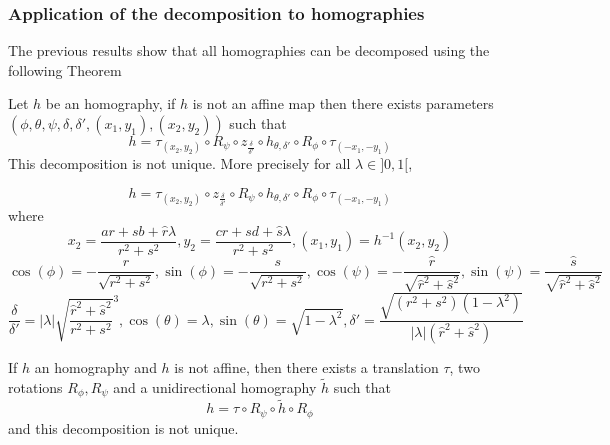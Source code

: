 \subsubsection{Application of the decomposition to homographies}
The previous results show that all homographies can be decomposed using the following Theorem

\begin{thm}
Let $h$ be an homography, if $h$ is not an affine map then there exists parameters $(\phi,\theta,\psi,\delta,\delta',(x_1,y_1),(x_2,y_2))$ such that
\begin{equation*}
h = \tau_{(x_2,y_2)} \circ R_{\psi} \circ z_{\frac{\delta}{\delta'}} \circ h_{\theta,\delta'} \circ R_{\phi} \circ \tau_{(-x_1,-y_1)}
\end{equation*}
This decomposition is not unique. More precisely for all $\lambda \in ]0,1[$,

  \begin{equation*}
h = \tau_{(x_2,y_2)} \circ z_{\frac{\delta}{\delta'}}  \circ R_{\psi} \circ h_{\theta,\delta'} \circ R_{\phi} \circ \tau_{(-x_1,-y_1)}
  \end{equation*}
  where 
 \begin{equation*}
x_2=\frac{ar+sb+\hat r \lambda}{r^2 +s^2}, y_2=\frac{cr+sd+\hat s \lambda}{r^2 +s^2}, (x_1 , y_1) = h^{-1}(x_{2},y_{2})
  \end{equation*}
 \begin{equation*}
 \cos( \phi )= - \frac{r}{\sqrt{r^2 + s^2}}, \sin( \phi )= - \frac{s}{\sqrt{r^2 + s^2}},\cos( \psi ) =- \frac{\hat r}{\sqrt{\hat r^2 + \hat s^2}}, \sin( \psi ) = \frac{\hat s}{\sqrt{\hat r^2 + \hat s^2}}
 \end{equation*}
 \begin{equation*}
 \frac{\delta}{\delta'}=|\lambda|\sqrt{\frac{\hat r^2 + \hat s^2}{r^2 + s^2}}^{3}, \cos(\theta)=\lambda, \sin(\theta)=\sqrt{1-\lambda^2}, \delta'=  \frac{\sqrt{(r^2 + s^2)(1-\lambda^2)}}{|\lambda| (\hat r^2+\hat s^2)}
 \end{equation*}
\label{thepropdecomp}
\end{thm}

\begin{corollaire} If $h$ an homography and $h$ is not affine, then there exists a translation $\tau$, two rotations $R_\phi ,R_\psi$ and a unidirectional homography $\tilde{h}$ such that
\begin{equation}
h=\tau \circ R_\psi \circ \tilde{h} \circ R_\phi
\label{formule_decomposition_effective}
\end{equation}
and this decomposition is not unique.
\end{corollaire}

